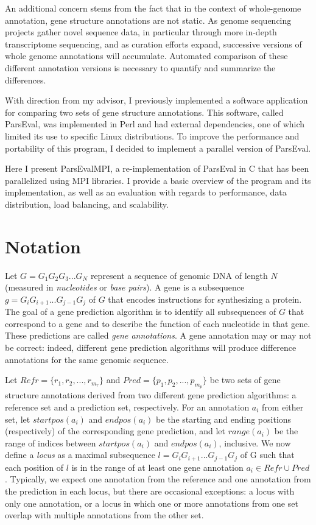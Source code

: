 \documentclass{bioinfo}
\begin{document}
An additional concern stems from the fact that in the context of whole-genome annotation, gene structure annotations are not static. As genome sequencing projects gather novel sequence data, in particular through more in-depth transcriptome sequencing, and as curation efforts expand, successive versions of whole genome annotations will accumulate. Automated comparison of these different annotation versions is necessary to quantify and summarize the differences.

With direction from my advisor, I previously implemented a software application for comparing two sets of gene structure annotations. This software, called ParsEval, was implemented in Perl and had external dependencies, one of which limited its use to specific Linux distributions. To improve the performance and portability of this program, I decided to implement a parallel version of ParsEval.

Here I present ParsEvalMPI, a re-implementation of ParsEval in C that has been parallelized using MPI libraries. I provide a basic overview of the program and its implementation, as well as an evaluation with regards to performance, data distribution, load balancing, and scalability.

\section*{Notation}
Let $G = G_1 G_2 G_3 ... G_N$ represent a sequence of genomic DNA of length $N$ (measured in \textit{nucleotides} or \textit{base pairs}). A gene is a subsequence $g = G_{i} G_{i+1} ... G_{j-1} G_{j}$ of $G$ that encodes instructions for synthesizing a protein. The goal of a gene prediction algorithm is to identify all subsequences of $G$ that correspond to a gene and to describe the function of each nucleotide in that gene. These predictions are called \textit{gene annotations}. A gene annotation may or may not be correct: indeed, different gene prediction algorithms will produce difference annotations for the same genomic sequence.

Let $Refr = \{ r_1, r_2, ..., r_{m_r} \}$ and $Pred = \{ p_1, p_2, ..., p_{m_p} \}$ be two sets of gene structure annotations derived from two different gene prediction algorithms: a reference set and a prediction set, respectively. For an annotation $a_i$ from either set, let $startpos(a_i)$ and $endpos(a_i)$ be the starting and ending positions (respectively) of the corresponding gene prediction, and let $range(a_i)$ be the range of indices between $startpos(a_i)$ and $endpos(a_i)$, inclusive. We now define a \textit{locus} as a maximal subsequence $l = G_{i} G_{i+1} ... G_{j-1} G_{j}$ of G such that each position of $l$ is in the range of at least one gene annotation $a_i \in Refr \cup Pred$. Typically, we expect one annotation from the reference and one annotation from the prediction in each locus, but there are occasional exceptions: a locus with only one annotation, or a locus in which one or more annotations from one set overlap with multiple annotations from the other set.
\end{document}
